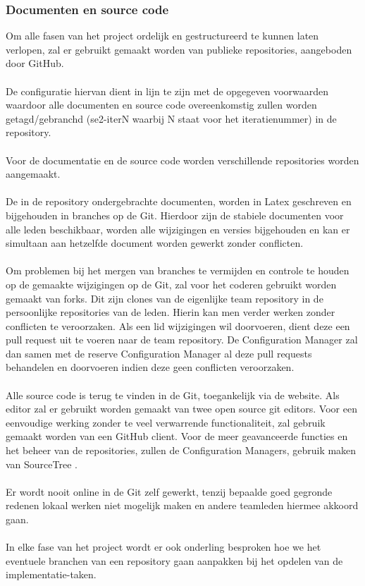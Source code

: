 \subsubsection{Documenten en source code}
Om alle fasen van het project ordelijk en gestructureerd te kunnen laten verlopen, zal er gebruikt gemaakt worden van publieke repositories, aangeboden door GitHub.
\\
\\
De configuratie hiervan dient in lijn te zijn met de opgegeven voorwaarden waardoor alle documenten en source code overeenkomstig zullen worden getagd/gebranchd (se2-iterN waarbij N staat voor het iteratienummer) in de repository.
\\
\\
Voor de documentatie en de source code worden verschillende repositories worden aangemaakt.
\\
\\
De in de repository ondergebrachte documenten, worden in Latex geschreven en bijgehouden in branches op de Git. Hierdoor zijn de stabiele documenten voor alle leden beschikbaar, worden alle wijzigingen en versies bijgehouden en kan er simultaan aan hetzelfde document worden gewerkt zonder conflicten.
\\
\\
Om problemen bij het mergen van branches te vermijden en controle te houden op de gemaakte wijzigingen op de Git, zal voor het coderen gebruikt worden gemaakt van forks. Dit zijn clones van de eigenlijke team repository in de persoonlijke repositories van de leden. Hierin kan men verder werken zonder conflicten te veroorzaken. Als een lid  wijzigingen wil doorvoeren, dient deze een pull request uit te voeren naar de team repository. De Configuration Manager zal dan samen met de reserve Configuration Manager al deze pull requests behandelen en doorvoeren indien deze geen conflicten veroorzaken.
\\
\\
Alle source code is terug te vinden in de Git, toegankelijk via de website. Als editor zal er gebruikt worden gemaakt van twee open source git editors. Voor een eenvoudige werking zonder te veel verwarrende functionaliteit, zal gebruik gemaakt worden van een GitHub client. Voor de meer geavanceerde functies en het beheer van de repositories, zullen de Configuration Managers, gebruik maken van SourceTree \cite{SourceTree}.
\\
\\
Er wordt nooit online in de Git zelf gewerkt, tenzij bepaalde goed gegronde redenen lokaal werken niet mogelijk maken en andere teamleden hiermee akkoord gaan.
\\
\\
In elke fase van het project wordt er ook onderling besproken hoe we het eventuele branchen van een repository gaan aanpakken bij het opdelen van de implementatie-taken.


